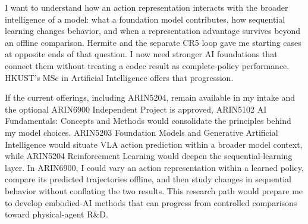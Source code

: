 I want to understand how an action representation interacts with the broader intelligence of a model: what a foundation model contributes, how sequential learning changes behavior, and when a representation advantage survives beyond an offline comparison. Hermite and the separate CR5 loop gave me starting cases at opposite ends of that question. I now need stronger AI foundations that connect them without treating a codec result as complete-policy performance. HKUST's MSc in Artificial Intelligence offers that progression.

If the current offerings, including ARIN5204, remain available in my intake and the optional ARIN6900 Independent Project is approved, ARIN5102 AI Fundamentals: Concepts and Methods would consolidate the principles behind my model choices. ARIN5203 Foundation Models and Generative Artificial Intelligence would situate VLA action prediction within a broader model context, while ARIN5204 Reinforcement Learning would deepen the sequential-learning layer. In ARIN6900, I could vary an action representation within a learned policy, compare its predicted trajectories offline, and then study changes in sequential behavior without conflating the two results. This research path would prepare me to develop embodied-AI methods that can progress from controlled comparisons toward physical-agent R\&D.
